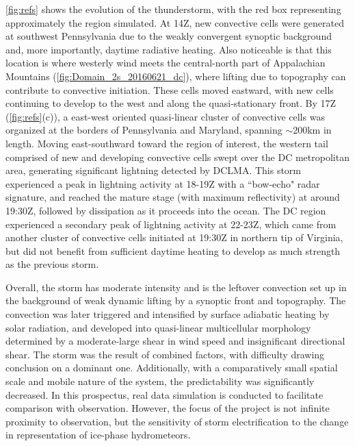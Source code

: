 \ref{fig:refs} shows the evolution of the thunderstorm, with the red box representing approximately the region simulated. At 14Z, new convective cells were generated at southwest Pennsylvania due to the weakly convergent synoptic background and, more importantly, daytime radiative heating. Also noticeable is that this location is where westerly wind meets the central-north part of Appalachian Mountains (\ref{fig:Domain_2s_20160621_dc}), where lifting due to topography can contribute to convective initiation. These cells moved eastward, with new cells continuing to develop to the west and along the quasi-stationary front. By 17Z (\ref{fig:refs}(c)), a east-west oriented quasi-linear cluster of convective cells was organized at the borders of Pennsylvania and Maryland, spanning $\sim$200km in length. Moving east-southward toward the region of interest, the western tail comprised of new and developing convective cells swept over the DC metropolitan area, generating significant lightning detected by DCLMA. This storm experienced a peak in lightning activity at 18-19Z with a ``bow-echo" radar signature, and reached the mature stage (with maximum reflectivity) at around 19:30Z, followed by dissipation as it proceeds into the ocean. The DC region experienced a secondary peak of lightning activity at 22-23Z, which came from another cluster of convective cells initiated at 19:30Z in northern tip of Virginia, but did not benefit from sufficient daytime heating to develop as much strength as the previous storm.

Overall, the storm has moderate intensity and is the leftover convection set up in the background of weak dynamic lifting by a synoptic front and topography. The convection was later triggered and intensified by surface adiabatic heating by solar radiation, and developed into quasi-linear multicellular morphology determined by a moderate-large shear in wind speed and insignificant directional shear. The storm was the result of combined factors, with difficulty drawing conclusion on a dominant one. Additionally, with a comparatively small spatial scale and mobile nature of the system, the predictability was significantly decreased.  In this prospectus, real data simulation is conducted to facilitate comparison with observation. However, the focus of the project is not infinite proximity to observation, but the sensitivity of storm electrification to the change in representation of ice-phase hydrometeors. 
